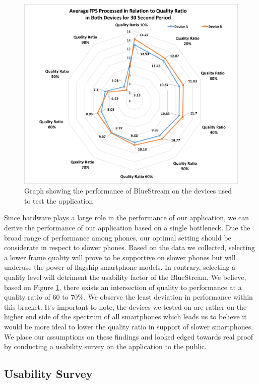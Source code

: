\documentclass[a4paper,12pt]{article}
\begin{document}
\begin{figure}[h!]
\centering
\includegraphics[scale=.6]{Figures/Figure18.png}
\caption{Graph showing the performance of BlueStream on the devices used to test the application}
\label{fig:PerformanceRadar}
\end{figure}

Since hardware plays a large role in the performance of our application, we can derive the performance of our application based on a single bottleneck. Due the broad range of performance among phones, our optimal setting should be considerate in respect to slower phones. Based on the data we collected, selecting a lower frame quality will prove to be supportive on slower phones but will underuse the power of flagship smartphone models. In contrary, selecting a quality level will detriment the usability factor of the BlueStream. We believe, based on Figure \ref{fig:PerformanceRadar}, there exists an intersection of quality to performance at a quality ratio of 60 to 70\%. We observe the least deviation in performance within this bracket. It’s important to note, the devices we tested on are rather on the higher end side of the spectrum of all smartphones which leads us to believe it would be more ideal to lower the quality ratio in support of slower smartphones. We place our assumptions on these findings and looked edged towards real proof by conducting a usability survey on the application to the public. 

\subsection{Usability Survey}
\end{document}
